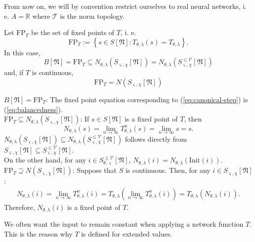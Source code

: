 \documentclass[a4paper,11pt]{report}
\newcommand{\const}{\varsigma} %
\newcommand{\var}{\chi} %
\newcommand{\In}{\text{Init}}
\begin{document}
\begin{Par}
From now on, we will by convention restrict ourselves to real neural networks, i. e. $A=\mathbb{R}$ where $\mathcal{T}$ is the norm topology.
\end{Par}

\begin{Lem}\label{lem:fixed-states}
Let $\text{FP}_T$ be the set of fixed points of $T$, i. e.
\[
\text{FP}_T:=\left\{s\in S[\mathfrak{N}]:T_{\theta,\lambda}(s)=T_{\theta,\lambda}\right\}.
\]
In this case,
\[
B[\mathfrak{N}]=\text{FP}_T\subseteq N_{\theta,\lambda}\left(S_{\const,\var}[\mathfrak{N}]\right)=N_{\theta,\lambda}\left(S^{\le\mathcal{V}}_{\const,\var}[\mathfrak{N}]\right)
\]
and, if $T$ is continuous, 
\[
\text{FP}_T=N\left(S_{\const,\var}[\mathfrak{N}]\right)
\]
\end{Lem}

\begin{Bew}
$B[\mathfrak{N}]=\text{FP}_T$: The fixed point equation corresponding to (\ref{eq:canonical-step}) is (\ref{eq:balancedness}).\\
$\text{FP}_T\subseteq N_{\theta,\lambda}\left(S_{\const,\var}[\mathfrak{N}]\right)$: If $s\in S[\mathfrak{N}]$ is a fixed point of $T$, then
\[
N_{\theta,\lambda}(s)=\lim_{n\to\infty}T_{\theta,\lambda}^n(s)=\lim_{n\to\infty}s=s.
\]
 $N_{\theta,\lambda}\left(S_{\const,\var}[\mathfrak{N}]\right)\subseteq N_{\theta,\lambda}\left(S^{\le\mathcal{V}}_{\const,\var}[\mathfrak{N}]\right)$ follows directly from $S_{\const,\var}[\mathfrak{N}]\subseteq S_{\const,\var}^{\le\mathcal{V}}[\mathfrak{N}]$.\\
On the other hand, for any $i\in S^{\le\mathcal{V}}_{\theta,\const}[\mathfrak{N}]$, $N_{\theta,\lambda}(i)=N_{\theta,\lambda}\left(\In(i)\right)$.\\
$\text{FP}_T\supseteq N\left(S_{\const,\var}[\mathfrak{N}]\right)$: Suppose that $S$ is continuous. Then, for any $i\in S_{\const,\var}[\mathfrak{N}]$:
\begin{align*}
N_{\theta,\lambda}(i)=\lim_{n\to\infty}T_{\theta,\lambda}^n(i)=T_{\theta,\lambda}\left(\lim_{n\to\infty}T^n_{\theta,\lambda}(i)\right)=T_{\theta,\lambda}\left(N_{\theta,\lambda}(i)\right).
\end{align*}
Therefore, $N_{\theta,\lambda}(i)$ is a fixed point of $T$.
\end{Bew}

\begin{Par}
We often want the input to remain constant when applying a network function $T$. This is the reason why $T$ is defined for extended values.
\end{Par}
\end{document}
